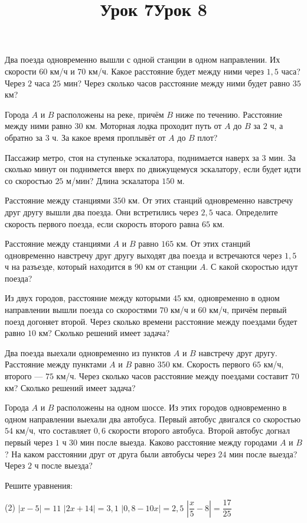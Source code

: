 \begin{class}[number=7-8]
	\title{Урок 7}
	\begin{listofex}
		\item Два поезда одновременно вышли с одной станции в одном направлении. Их скорости \(60\) км/ч и \(70\) км/ч. Какое расстояние будет между ними через \(1,5\) часа? Через \(2\) часа \(25\) мин? Через сколько часов расстояние между ними будет равно \(35\) км?
		\item Города \(A\) и \(B\) расположены на реке, причём \(B\) ниже по течению. Расстояние между ними равно \(30\) км. Моторная лодка проходит путь от \(A\) до \(B\) за \(2\) ч, а обратно за \(3\) ч. За какое время проплывёт от \(A\) до \(B\) плот?
		\item Пассажир метро, стоя на ступеньке эскалатора, поднимается наверх за \(3\) мин. За сколько минут он поднимется вверх по движущемуся эскалатору, если будет идти со скоростью \(25\) м/мин? Длина эскалатора \(150\) м.
		\item Расстояние между станциями \(350\) км. От этих станций одновременно навстречу друг другу вышли два поезда. Они встретились через \(2,5\) часа. Определите скорость первого поезда, если скорость второго равна \(65\) км.
	\end{listofex}
	\title{Урок 8}
	\begin{listofex}[resume]
		\item Расстояние между станциями \(A\) и \(B\) равно \(165\) км. От этих станций одновременно навстречу друг другу выходят два поезда и встречаются через \(1,5\) ч на разъезде, который находится в \(90\) км от станции \(A\). С какой скоростью идут поезда?
		\item Из двух городов, расстояние между которыми \(45\) км, одновременно в одном направлении вышли поезда со скоростями \(70\) км/ч и \(60\) км/ч, причём первый поезд догоняет второй. Через сколько времени расстояние между поездами будет равно \(10\) км? Сколько решений имеет задача?
		\item Два поезда выехали одновременно из пунктов \(A\) и \(B\) навстречу друг другу. Расстояние между пунктами \(A\) и \(B\) равно \(350\) км. Скорость первого \(65\) км/ч, второго --- \(75\) км/ч. Через сколько часов расстояние между поездами составит \(70\) км? Сколько решений имеет задача?
		\item Города \(A\) и \(B\) расположены на одном шоссе. Из этих городов одновременно в одном направлении выехали два автобуса. Первый автобус двигался со скоростью \(54\) км/ч, что составляет \(0,6\) скорости второго автобуса. Второй автобус догнал первый через \(1\) ч \(30\) мин после выезда. Каково расстояние между городами \(A\) и \(B\)? На каком расстоянии друг от друга были автобусы через \(24\) мин после выезда? Через \(2\) ч после выезда?
		\item Решите уравнения:
		\begin{tasks}(2)
			\task \( |x-5|=11 \)
			\task \( |2x+14|=3,1 \)
			\task \( |0,8-10x|=2,5 \)
			\task \( \left| \dfrac{ x }{ 5 }-8 \right|=\dfrac{ 17 }{ 25 } \)
		\end{tasks}
	\end{listofex}
\end{class}

